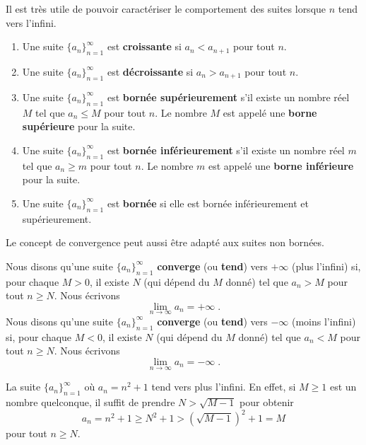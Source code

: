 {Il est très utile de pouvoir caractériser le comportement des suites
lorsque $n$ tend vers l'infini.

\begin{defn}
\begin{enumerate}
\item Une suite $\{a_n\}_{n=1}^\infty$ est {\bfseries croissante}
 si $a_n < a_{n+1}$ pour tout $n$.
\item Une suite $\{a_n\}_{n=1}^\infty$ est {\bfseries décroissante}
 si $a_n > a_{n+1}$ pour tout $n$.
\item Une suite $\{a_n\}_{n=1}^\infty$ est
{\bfseries bornée supérieurement}
s'il existe un nombre réel $M$ tel que $a_n \leq M$ pour tout $n$.  Le
nombre $M$ est appelé une {\bfseries borne supérieure} pour la suite.
\item Une suite $\{a_n\}_{n=1}^\infty$ est
{\bfseries bornée inférieurement}
s'il existe un nombre réel $m$ tel que $a_n \geq m$ pour tout $n$.  Le
nombre $m$ est appelé une {\bfseries borne inférieure} pour la suite.
\item Une suite $\{a_n\}_{n=1}^\infty$ est
{\bfseries bornée} si elle est bornée
inférieurement et supérieurement.
\end{enumerate}
\end{defn}

Le concept de convergence peut aussi être adapté aux suites non bornées.

\begin{theorem}[+\theory]
Nous disons qu'une suite $\displaystyle \{ a_n\}_{n=1}^\infty$
{\bfseries converge} (ou {\bfseries tend}) vers $+\infty$ (plus
l'infini) si, pour chaque $M>0$, il existe $N$ (qui dépend du $M$ donné)
tel que $a_n > M$ pour tout $n \geq N$.  Nous écrivons
\[
\lim_{n\rightarrow \infty} a_n = +\infty \; .
\]
Nous disons qu'une suite $\displaystyle \{ a_n\}_{n=1}^\infty$
{\bfseries converge} (ou {\bfseries tend}) vers $-\infty$ (moins
l'infini) si, pour chaque $M<0$, il existe $N$ (qui dépend du $M$ donné)
tel que $a_n < M$ pour tout $n \geq N$.  Nous écrivons
\[
\lim_{n\rightarrow \infty} a_n = -\infty \; .
\]
\label{def_of_lim_at_inf}
\end{theorem}

\begin{egg}[\theory]
La suite $\displaystyle \{ a_n\}_{n=1}^\infty$ où $a_n = n^2+1$ tend
vers plus l'infini.  En effet, si $M\geq 1$ est un nombre quelconque,
il suffit de prendre $N > \sqrt{M-1}$ pour obtenir
\[
a_n = n^2+1 \geq N^2+1 > \left(\sqrt{M-1}\right)^2 + 1 = M
\]
pour tout $n\geq N$.
\end{egg}

}

